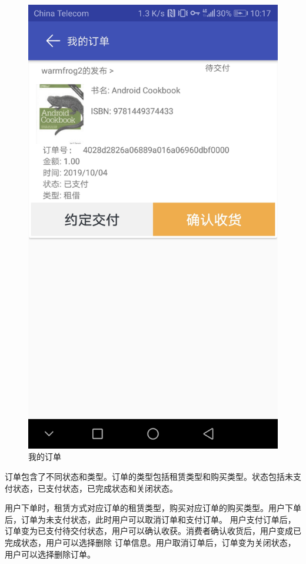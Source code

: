 \begin{figure}[h]
	\centering
	\includegraphics[scale=0.09]{Chapters/UI/unrecieved_order.jpg}
	\caption{我的订单}
	\label{unrecieved_order}
\end{figure}

订单包含了不同状态和类型。订单的类型包括租赁类型和购买类型。状态包括未支付状态，已支付状态，已完成状态和关闭状态。

用户下单时，租赁方式对应订单的租赁类型，购买对应订单的购买类型。用户下单后，订单为未支付状态，此时用户可以取消订单和支付订单。
用户支付订单后，订单变为已支付待交付状态，用户可以确认收获。消费者确认收货后，用户变成已完成状态，用户可以选择删除
订单信息。用户取消订单后，订单变为关闭状态，用户可以选择删除订单。

